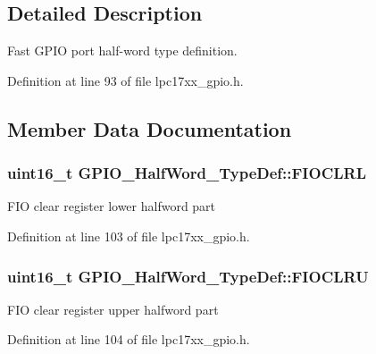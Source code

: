 \subsection{\-Detailed \-Description}
\-Fast \-G\-P\-I\-O port half-\/word type definition. 

\-Definition at line 93 of file lpc17xx\-\_\-gpio.\-h.



\subsection{\-Member \-Data \-Documentation}
\hypertarget{struct_g_p_i_o___half_word___type_def_a09c353d2900db4526ff5a5f9ef9c95cf}{
\subsubsection[{\-F\-I\-O\-C\-L\-R\-L}]{ uint16\-\_\-t {\bf \-G\-P\-I\-O\-\_\-\-Half\-Word\-\_\-\-Type\-Def\-::\-F\-I\-O\-C\-L\-R\-L}}}\label{struct_g_p_i_o___half_word___type_def_a09c353d2900db4526ff5a5f9ef9c95cf}
\-F\-I\-O clear register lower halfword part 

\-Definition at line 103 of file lpc17xx\-\_\-gpio.\-h.

\hypertarget{struct_g_p_i_o___half_word___type_def_a96e5f63bb938ed3a44ad1d9dcb4ae4de}{
\subsubsection[{\-F\-I\-O\-C\-L\-R\-U}]{ uint16\-\_\-t {\bf \-G\-P\-I\-O\-\_\-\-Half\-Word\-\_\-\-Type\-Def\-::\-F\-I\-O\-C\-L\-R\-U}}}\label{struct_g_p_i_o___half_word___type_def_a96e5f63bb938ed3a44ad1d9dcb4ae4de}
\-F\-I\-O clear register upper halfword part 

\-Definition at line 104 of file lpc17xx\-\_\-gpio.\-h.

